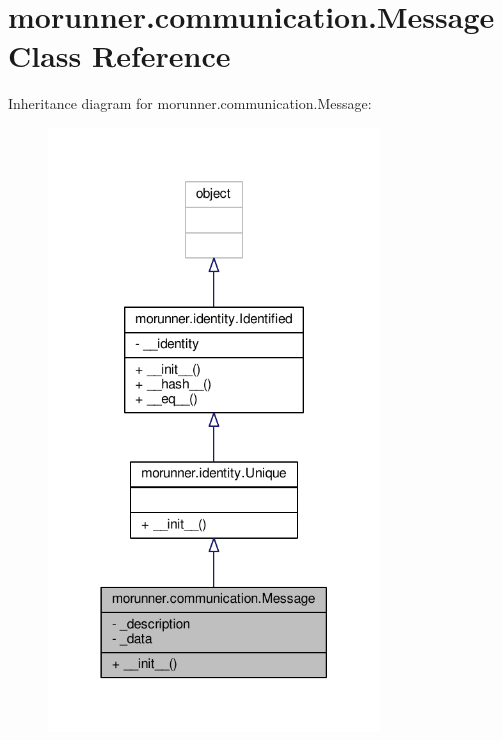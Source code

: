 \hypertarget{classmorunner_1_1communication_1_1Message}{}\section{morunner.\+communication.\+Message Class Reference}
\label{classmorunner_1_1communication_1_1Message}


Inheritance diagram for morunner.\+communication.\+Message\+:
\nopagebreak
\begin{figure}[H]
\begin{center}
\leavevmode
\includegraphics[width=249pt]{classmorunner_1_1communication_1_1Message__inherit__graph}
\end{center}
\end{figure}


